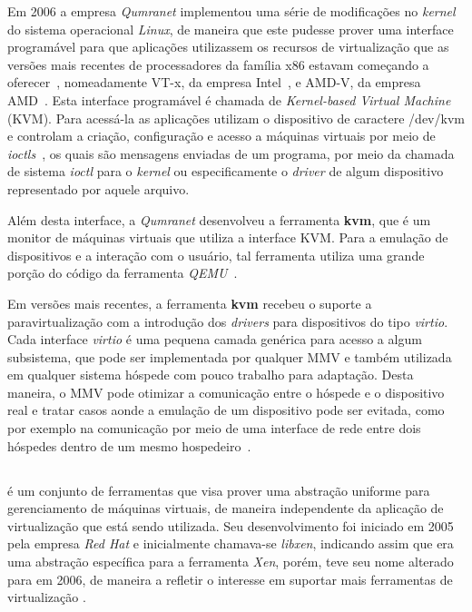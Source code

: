 Em 2006 a empresa \emph{Qumranet} implementou uma série de modificações no
\emph{kernel} do sistema operacional \emph{Linux}, de maneira que este pudesse prover
uma interface programável para que aplicações utilizassem os recursos de
virtualização que as versões mais recentes de processadores da família
x86 estavam começando a oferecer~\cite{kerneltrap2007avi}, nomeadamente
VT-x, da empresa Intel~\cite{uhlig2005intel}, e AMD-V, da empresa
AMD~\cite{strongin2005trusted}.  Esta interface programável é chamada de
\emph{Kernel-based Virtual Machine} (KVM). Para acessá-la as aplicações
utilizam o dispositivo de caractere /dev/kvm e controlam a criação,
configuração e acesso a máquinas virtuais por meio de
\emph{ioctls}~\cite{kivity2007kvm}, os quais são mensagens enviadas de um programa,
por meio da chamada de sistema \emph{ioctl} para o \emph{kernel} ou especificamente o
\emph{driver} de algum dispositivo representado por aquele arquivo.

Além desta interface, a \emph{Qumranet} desenvolveu a ferramenta \textbf{kvm},
que é um monitor de máquinas virtuais que utiliza a interface KVM. Para a
emulação de dispositivos e a interação com o usuário, tal ferramenta utiliza uma grande
porção do código da ferramenta \emph{QEMU}~\cite{kerneltrap2007avi}.

Em versões mais recentes, a ferramenta \textbf{kvm} recebeu o suporte a
paravirtualização com a introdução dos \emph{drivers} para dispositivos do tipo
\emph{virtio}. Cada interface \emph{virtio} é uma pequena camada genérica para
acesso a algum subsistema, que pode ser implementada por qualquer MMV e também
utilizada em qualquer sistema hóspede com pouco trabalho para adaptação. Desta
maneira, o MMV pode otimizar a comunicação entre o hóspede e o dispositivo real
e tratar casos aonde a emulação de um dispositivo pode ser evitada, como
por exemplo na comunicação por meio de uma interface de rede entre dois
hóspedes dentro de um mesmo hospedeiro~\cite{russell2008virtio}.


\subsection{\libvirt}\label{sec:libvirt}


\libvirt{} é um conjunto de ferramentas que visa prover uma abstração
uniforme para gerenciamento de máquinas virtuais, de maneira independente 
da aplicação de virtualização que está sendo utilizada. Seu desenvolvimento
foi iniciado em 2005 pela empresa \emph{Red Hat} e inicialmente chamava-se
\emph{libxen}, indicando assim que era uma abstração específica para a
ferramenta \emph{Xen}, porém, teve seu nome alterado para \libvirt{} em
2006, de maneira a refletir o interesse em suportar mais ferramentas de
virtualização .

